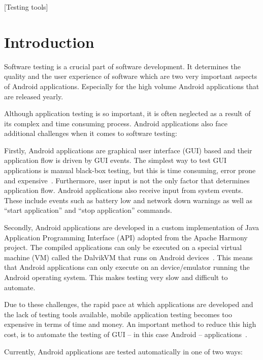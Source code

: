 \documentclass{acm_proc_article-sp}
\begin{document}
[Testing tools]



\section{Introduction}
Software testing is a crucial part of software development. It determines the quality and the user
experience of software which are two very important aspects of Android applications. Especially for the high volume Android applications
that are released yearly. 

Although application testing is so important, it is often neglected as a result of its complex and time consuming process. Android
applications also face additional challenges when it comes to software testing:

Firstly, Android applications are graphical user interface (GUI) based and their application flow is driven by GUI events. The
simplest way to test GUI applications is manual black-box testing, but this is time consuming, error prone and
expensive~\cite{AccessibilityTech}. Furthermore, user input is not the only factor that determines application flow. Android applications
also receive input from system events. These include events such as battery low and network down warnings as well as ``start application'' and
``stop application'' commands.

Secondly, Android applications are developed in a custom implementation of Java Application Programming Interface (API)
 adopted from the Apache Harmony~\cite{harmony} project. The
compiled applications can only be executed on a special virtual machine (VM) called the DalvikVM that runs on Android devices~\cite{dalvik}. 
This means that Android applications can only execute on an device/emulator running the Android operating system. This makes testing very slow and
difficult to automate.

Due to these challenges, the rapid pace at which applications are developed and the lack of testing tools available, mobile application
testing becomes too expensive in terms of time and money. An important method to reduce this high cost, is to 
automate the testing of GUI -- in this case Android -- applications~\cite{AccessibilityTech}.

Currently, Android applications are tested automatically in one of two ways:
\end{document}
